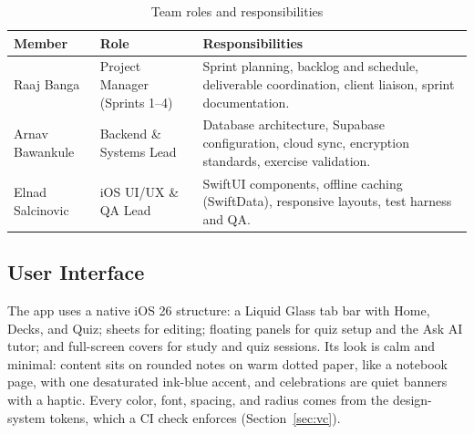 \documentclass[12pt,letterpaper]{article}
\begin{document}
\begin{table}[H]
\centering
\caption{Team roles and responsibilities}
\label{tab:team}
\begin{tabularx}{\textwidth}{@{}L{3.1cm} L{3.3cm} Y@{}}
\toprule
\textbf{Member} & \textbf{Role} & \textbf{Responsibilities} \\
\midrule
Raaj Banga & Project Manager (Sprints 1--4) & Sprint planning, backlog and schedule, deliverable coordination, client liaison, sprint documentation. \\
Arnav Bawankule & Backend \& Systems Lead & Database architecture, Supabase configuration, cloud sync, encryption standards, exercise validation. \\
Elnad Salcinovic & iOS UI/UX \& QA Lead & SwiftUI components, offline caching (SwiftData), responsive layouts, test harness and QA. \\
\bottomrule
\end{tabularx}
\end{table}

\subsection{User Interface}\label{sec:ui}
The app uses a native iOS 26 structure: a Liquid Glass tab bar with Home, Decks, and
Quiz; sheets for editing; floating panels for quiz setup and the Ask AI tutor; and
full-screen covers for study and quiz sessions. Its look is calm and minimal: content
sits on rounded notes on warm dotted paper, like a notebook page, with one desaturated
ink-blue accent, and celebrations are quiet banners with a haptic. Every color, font,
spacing, and radius comes from the design-system tokens, which a CI check enforces
(Section~\ref{sec:vc}).
\end{document}

